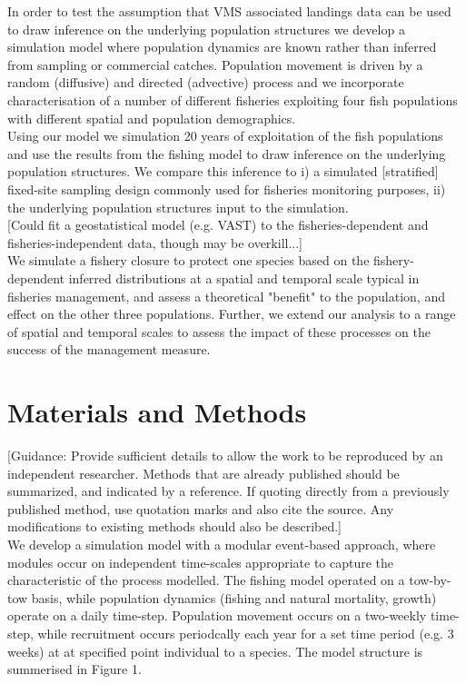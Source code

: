 \documentclass[review]{elsarticle}
\begin{document}
In order to test the assumption that VMS associated landings data can be used
to draw inference on the underlying population structures we develop a
simulation model where population dynamics are known rather than inferred from
sampling or commercial catches. Population movement is driven by a random
(diffusive) and directed (advective) process and we incorporate
characterisation of a number of different fisheries exploiting four fish
populations with different spatial and population demographics.\\

Using our model we simulation 20 years of exploitation of the fish populations
and use the results from the fishing model to draw inference on the underlying
population structures.  We compare this inference to i) a simulated
[stratified] fixed-site sampling design commonly used for fisheries monitoring
purposes, ii) the underlying population structures input to the simulation.\\

[Could fit a geostatistical model (e.g. VAST) to the fisheries-dependent and
fisheries-independent data, though may be overkill...] \\

We simulate a fishery closure to protect one species based on the
fishery-dependent inferred distributions at a spatial and temporal scale
typical in fisheries management, and assess a theoretical "benefit" to the
population, and effect on the other three populations. Further, we extend our
analysis to a range of spatial and temporal scales to assess the impact of
these processes on the success of the management measure. \\

\section{Materials and Methods}

[Guidance: Provide sufficient details to allow the work to be reproduced by an
independent researcher. Methods that are already published should be
summarized, and indicated by a reference.  If quoting directly from a
previously published method, use quotation marks and also cite the source. Any
modifications to existing methods should also be described.] \\ 

We develop a simulation model with a modular event-based approach, where
modules occur on independent time-scales appropriate to capture the
characteristic of the process modelled. The fishing model operated on a
tow-by-tow basis, while population dynamics (fishing and natural mortality,
growth) operate on a daily time-step.  Population movement occurs on a
two-weekly time-step, while recruitment occurs periodcally each year for a set
time period (e.g. 3 weeks) at at specified point individual to a species. The
model structure is summerised in Figure 1.\\
\end{document}
